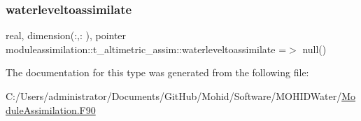 \subsubsection{\texorpdfstring{waterleveltoassimilate}{waterleveltoassimilate}}
{\footnotesize\ttfamily real, dimension(\+:,\+:  ), pointer moduleassimilation\+::t\+\_\+altimetric\+\_\+assim\+::waterleveltoassimilate =$>$ null()\hspace{0.3cm}{\ttfamily [private]}}



The documentation for this type was generated from the following file\+:\begin{DoxyCompactItemize}
\item 
C\+:/\+Users/administrator/\+Documents/\+Git\+Hub/\+Mohid/\+Software/\+M\+O\+H\+I\+D\+Water/\mbox{\hyperlink{_module_assimilation_8_f90}{Module\+Assimilation.\+F90}}\end{DoxyCompactItemize}
